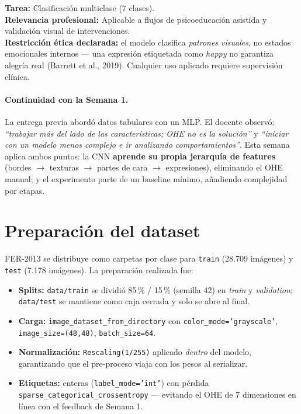 \documentclass[10pt,a4paper,twocolumn]{article}
\begin{document}
\textbf{Tarea:} Clasificación multiclase (7 clases).\\
\textbf{Relevancia profesional:} Aplicable a flujos de psicoeducación asistida y validación visual de intervenciones.\\
\textbf{Restricción ética declarada:} el modelo clasifica \textit{patrones visuales}, no estados emocionales internos --- una expresión etiquetada como \textit{happy} no garantiza alegría real (Barrett et al., 2019). Cualquier uso aplicado requiere supervisión clínica.

\paragraph{Continuidad con la Semana 1.} La entrega previa abordó datos tabulares con un MLP. El docente observó: \textit{``trabajar más del lado de las características; OHE no es la solución''} y \textit{``iniciar con un modelo menos complejo e ir analizando comportamientos''}. Esta semana aplica ambos puntos: la CNN \textbf{aprende su propia jerarquía de features} (bordes $\rightarrow$ texturas $\rightarrow$ partes de cara $\rightarrow$ expresiones), eliminando el OHE manual; y el experimento parte de un baseline mínimo, añadiendo complejidad por etapas.

\section{Preparación del dataset}

FER-2013 se distribuye como carpetas por clase para \texttt{train} (28.709 imágenes) y \texttt{test} (7.178 imágenes). La preparación realizada fue:

\begin{itemize}
    \item \textbf{Splits:} \texttt{data/train} se dividió 85\,\% / 15\,\% (semilla 42) en \textit{train} y \textit{validation}; \texttt{data/test} se mantiene como caja cerrada y solo se abre al final.
    \item \textbf{Carga:} \texttt{image\_dataset\_from\_directory} con \texttt{color\_mode='grayscale'}, \texttt{image\_size=(48,48)}, \texttt{batch\_size=64}.
    \item \textbf{Normalización:} \texttt{Rescaling(1/255)} aplicado \textit{dentro} del modelo, garantizando que el pre-proceso viaja con los pesos al serializar.
    \item \textbf{Etiquetas:} enteras (\texttt{label\_mode='int'}) con pérdida \texttt{sparse\_categorical\_crossentropy} --- evitando el OHE de 7 dimensiones en línea con el feedback de Semana 1.
\end{itemize}
\end{document}
